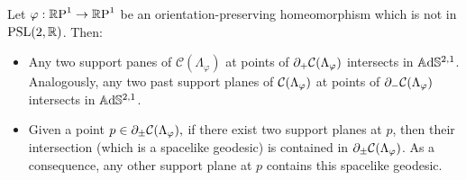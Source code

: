 \begin{lemma}\label{condor}
    Let $\varphi:\S\to\S$ be an orientation-preserving homeomorphism which is not in $\PSL$. Then: 
    \begin{itemize}
        \item Any two support panes of $\mathcal{C}(\Lambda_\varphi)$ at points of $\partial_+\CF$ intersects in $\A^{2,1}$. Analogously, any two past support planes of $\CF$ at points of $\partial_-\CF$ intersects in $\A^{2,1}$.
        \item Given a point $p\in\partial_\pm\CF,$ if there exist two support planes at $p$, then their intersection (which is a spacelike geodesic) is contained in $\partial_\pm\CF$. As a consequence, any other support plane at $p$ contains this spacelike geodesic.
    \end{itemize}
\end{lemma}

